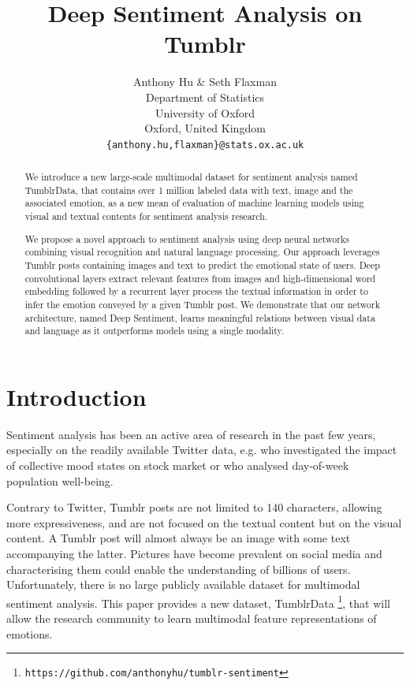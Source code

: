 \documentclass{article} %
\title{Deep Sentiment Analysis on Tumblr}
\author{Anthony Hu \& Seth Flaxman \\
Department of Statistics\\
University of Oxford\\
Oxford, United Kingdom \\
\texttt{\{anthony.hu,flaxman\}@stats.ox.ac.uk}
}
\begin{document}
\maketitle

\begin{abstract}
We introduce a new large-scale multimodal dataset for sentiment analysis named TumblrData, that contains over 1 million labeled data with text, image and the associated emotion, as a new mean of evaluation of machine learning models using visual and textual contents for sentiment analysis research.

We propose a novel approach to sentiment analysis using deep neural networks combining visual recognition and natural language processing. Our approach leverages Tumblr posts containing images and text to predict the emotional state of users. Deep convolutional layers extract relevant features from images and high-dimensional word embedding followed by a recurrent layer process the textual information in order to infer the emotion conveyed by a given Tumblr post. We demonstrate that our network architecture, named Deep Sentiment, learns meaningful relations between visual data and language as it outperforms models using a single modality.%
\end{abstract}

\section{Introduction}
Sentiment analysis has been an active area of research in the past few years, especially on the readily available Twitter data, e.g. \citet{Bollen} who investigated the impact of collective mood states on stock market or \cite{Flaxman-16} who analysed day-of-week population well-being.

Contrary to Twitter, Tumblr posts are not limited to 140 characters, allowing more expressiveness, and are not focused on the textual content but on the visual content. A Tumblr post will almost always be an image with some text accompanying the latter. Pictures have become prevalent on social media and characterising them could enable the understanding of billions of users. Unfortunately, there is no large publicly available dataset for multimodal sentiment analysis. This paper provides a new dataset, TumblrData \footnote{\texttt{https://github.com/anthonyhu/tumblr-sentiment}}, that will allow the research community to learn multimodal feature representations of emotions.
\end{document}
